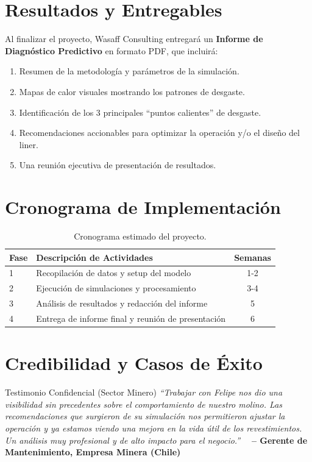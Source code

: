 \documentclass[11pt, a4paper]{article}
\begin{document}
\section{Resultados y Entregables}
Al finalizar el proyecto, Wasaff Consulting entregará un \textbf{Informe de Diagnóstico Predictivo} en formato PDF, que incluirá:
\begin{enumerate}
    \item Resumen de la metodología y parámetros de la simulación.
    \item Mapas de calor visuales mostrando los patrones de desgaste.
    \item Identificación de los 3 principales ``puntos calientes'' de desgaste.
    \item Recomendaciones accionables para optimizar la operación y/o el diseño del liner.
    \item Una reunión ejecutiva de presentación de resultados.
\end{enumerate}

\section{Cronograma de Implementación}
\begin{table}[h!]
\centering
\begin{tabular}{lp{10cm}c}
\toprule
\textbf{Fase} & \textbf{Descripción de Actividades} & \textbf{Semanas} \\
\midrule
1 & Recopilación de datos y setup del modelo & 1-2 \\
2 & Ejecución de simulaciones y procesamiento & 3-4 \\
3 & Análisis de resultados y redacción del informe & 5 \\
4 & Entrega de informe final y reunión de presentación & 6 \\
\bottomrule
\end{tabular}
\caption{Cronograma estimado del proyecto.}
\end{table}

\section{Credibilidad y Casos de Éxito}
\begin{infobox}{Testimonio Confidencial (Sector Minero)}
    \textit{``Trabajar con Felipe nos dio una visibilidad sin precedentes sobre el comportamiento de nuestro molino. Las recomendaciones que surgieron de su simulación nos permitieron ajustar la operación y ya estamos viendo una mejora en la vida útil de los revestimientos. Un análisis muy profesional y de alto impacto para el negocio.''}
    \
    \
    \textbf{-- Gerente de Mantenimiento, Empresa Minera (Chile)}
\end{infobox}
\end{document}
